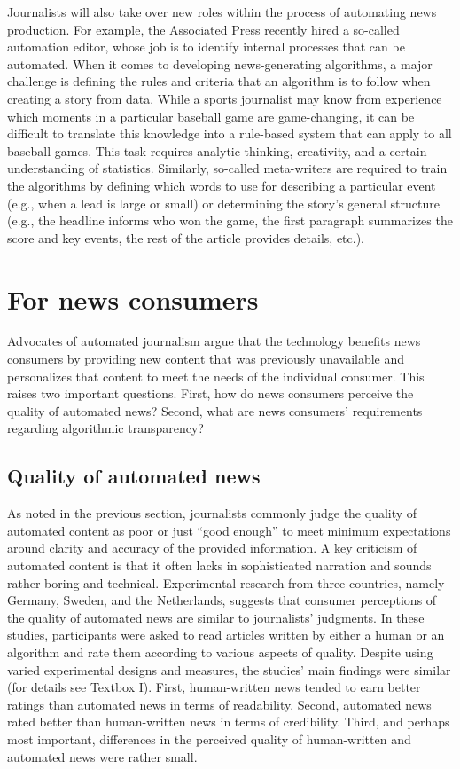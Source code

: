 \documentclass[notoc, symmetric, nobib, nols]{towcenter-guideto-book}
\begin{document}
Journalists will also take over new roles within the process of automating news production. For example, the Associated Press recently hired a so-called automation editor, whose job is to identify internal processes that can be automated. When it comes to developing news-generating algorithms, a major challenge is defining the rules and criteria that an algorithm is to follow when creating a story from data. While a sports journalist may know from experience which moments in a particular baseball game are game-changing, it can be difficult to translate this knowledge into a rule-based system that can apply to all baseball games. This task requires analytic thinking, creativity, and a certain understanding of statistics. Similarly, so-called meta-writers are required to train the algorithms by defining which words to use for describing a particular event (e.g., when a lead is large or small) or determining the story's general structure (e.g., the headline informs who won the game, the first paragraph summarizes the score and key events, the rest of the article provides details, etc.).

\section{For news consumers}

Advocates of automated journalism argue that the technology benefits news consumers by providing new content that was previously unavailable and personalizes that content to meet the needs of the individual consumer. This raises two important questions. First, how do news consumers perceive the quality of automated news? Second, what are news consumers' requirements regarding algorithmic transparency?
 
\subsection{Quality of automated news}

As noted in the previous section, journalists commonly judge the quality of automated content as poor or just ``good enough'' to meet minimum expectations around clarity and accuracy of the provided information. A key criticism of automated content is that it often lacks in sophisticated narration and sounds rather boring and technical. Experimental research from three countries, namely Germany, Sweden, and the Netherlands, suggests that consumer perceptions of the quality of automated news are similar to journalists' judgments. In these studies, participants were asked to read articles written by either a human or an algorithm and rate them according to various aspects of quality.\autocites{clerwall15, kaa14, graefe15} Despite using varied experimental designs and measures, the studies' main findings were similar (for details see Textbox I). First, human-written news tended to earn better ratings than automated news in terms of readability. Second, automated news rated better than human-written news in terms of credibility. Third, and perhaps most important, differences in the perceived quality of human-written and automated news were rather small.
\end{document}
